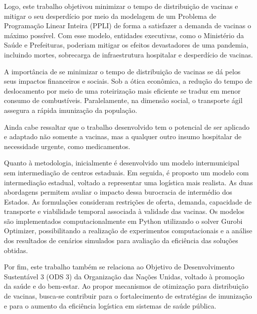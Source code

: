 Logo, este trabalho objetivou minimizar o tempo de distribuição de vacinas e mitigar o seu desperdício por meio da modelagem de um Problema de Programação Linear Inteira (PPLI) de forma a satisfazer a demanda de vacinas o máximo possível. Com esse modelo, entidades executivas, como o Ministério da Saúde e Prefeituras, poderiam mitigar os efeitos devastadores de uma pandemia, incluindo mortes, sobrecarga de infraestrutura hospitalar e desperdício de vacinas.

A importância de se minimizar o tempo de distribuição de vacinas se dá pelos seus impactos financeiros e sociais.
Sob a ótica econômica, a redução do tempo de deslocamento por meio de uma roteirização mais eficiente se traduz em menor consumo de combustíveis. Paralelamente, na dimensão social, o transporte ágil assegura a rápida imunização da população.

Ainda cabe ressaltar que o trabalho desenvolvido tem o potencial de ser aplicado e adaptado não somente a vacinas, mas a qualquer outro insumo hospitalar de necessidade urgente, como medicamentos.

Quanto à metodologia, inicialmente é desenvolvido um modelo intermunicipal sem intermediação de centros estaduais. Em seguida, é proposto um modelo com intermediação estadual, voltado a representar uma logística mais realista. As duas abordagens permitem avaliar o impacto dessa burocracia de intermédio dos Estados. As formulações consideram restrições de oferta, demanda, capacidade de transporte e viabilidade temporal associada à validade das vacinas. Os modelos são implementados computacionalmente em Python utilizando o solver Gurobi Optimizer, possibilitando a realização de experimentos computacionais e a análise dos resultados de cenários simulados para avaliação da eficiência das soluções obtidas.

Por fim, este trabalho também se relaciona ao Objetivo de Desenvolvimento Sustentável 3 (ODS 3) da Organização das Nações Unidas, voltado à promoção da saúde e do bem-estar. Ao propor mecanismos de otimização para distribuição de vacinas, busca-se contribuir para o fortalecimento de estratégias de imunização e para o aumento da eficiência logística em sistemas de saúde pública.

\bigskip
